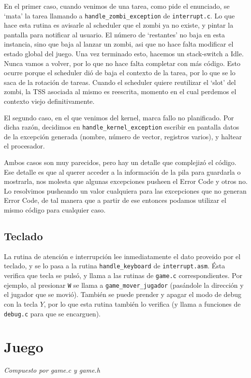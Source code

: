 \documentclass{article}
\begin{document}
	En el primer caso, cuando venimos de una tarea, como pide el enunciado, se `mata' la tarea llamando a \texttt{handle\_zombi\_exception} de \texttt{interrupt.c}. Lo que hace esta rutina es avisarle al scheduler que el zombi ya no existe, y pintar la pantalla para notificar al usuario. El número de `restantes' no baja en esta instancia, sino que baja al lanzar un zombi, asi que no hace falta modificar el estado global del juego. Una vez terminado esto, hacemos un stack-switch a Idle. Nunca vamos a volver, por lo que no hace falta completar con más código. Esto ocurre porque el scheduler dió de baja el contexto de la tarea, por lo que se lo saca de la rotación de tareas. Cuando el scheduler quiere reutilizar el `slot' del zombi, la TSS asociada al mismo es reescrita, momento en el cual perdemos el contexto viejo definitivamente.
	
	El segundo caso, en el que venimos del kernel, marca fallo no planificado. Por dicha razón, decidimos en \texttt{handle\_kernel\_exception} escribir en pantalla datos de la excepción generada (nombre, número de vector, registros varios), y haltear el procesador.

	Ambos casos son muy parecidos, pero hay un detalle que complejizó el código. Ese detalle es que al querer acceder a  la información de la pila para guardarla o mostrarla, nos molesta que algunas excepciones pusheen el Error Code y otros no. Lo resolvimos pusheando un valor cualquiera para las excepciones que no generan Error Code, de tal manera que a partir de ese entonces podamos utilizar el mismo código para cualquier caso.
	
	\subsection*{Teclado}
	
	La rutina de atención e interrupción lee inmediatamente el dato proveido por el teclado, y se lo pasa a la rutina \texttt{handle\_keyboard} de \texttt{interrupt.asm}. Ésta verifica que tecla se pulsó, y llama a las rutinas de \texttt{game.c} correspondientes. Por ejemplo, al presionar \texttt{W} se llama a \texttt{game\_mover\_jugador} (pasándole la dirección y el jugador que se movió). También se puede prender y apagar el modo de debug con la tecla $Y$, por lo que esta rutina también lo verifica (y llama a funciones de \texttt{debug.c} para que se encarguen).

	
	\section{Juego}
	\vspace{-1cm}	
	\begin{flushright}
	\textit{Compuesto por game.c y game.h}
	\end{flushright}
	
\end{document}
